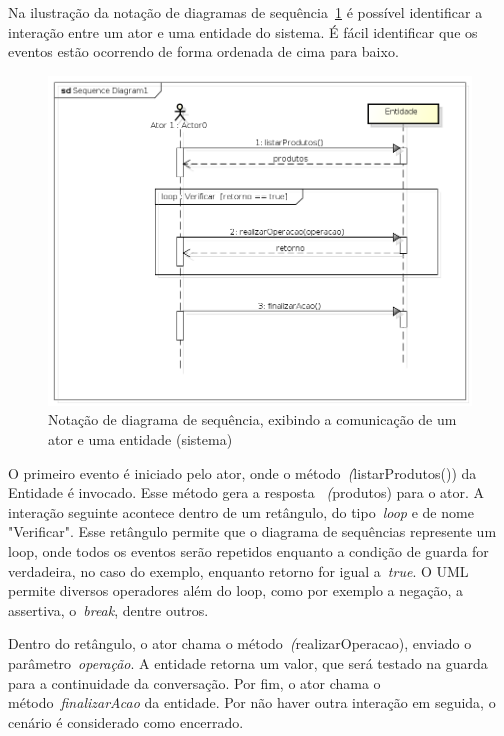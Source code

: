 Na ilustração da notação de diagramas de sequência~\ref{fig:exemplo-diagrama-sequencia} é possível identificar a interação entre um ator e uma entidade do sistema. É fácil identificar que os eventos estão ocorrendo de forma ordenada de cima para baixo.
\begin{figure}
	\centering
	\includegraphics[scale=0.75]{images/exemplo-diagrama-sequencia.png}
	\caption{Notação de diagrama de sequência, exibindo a comunicação de um ator e uma entidade (sistema)}
	\label{fig:exemplo-diagrama-sequencia}
\end{figure}

O primeiro evento é iniciado pelo ator, onde o método~\emph(listarProdutos()) da Entidade é invocado. Esse método gera a resposta ~\emph(produtos) para o ator. A interação seguinte acontece dentro de um retângulo, do tipo~\emph{loop} e de nome "Verificar". Esse retângulo permite que o diagrama de sequências represente um loop, onde todos os eventos serão repetidos enquanto a condição de guarda for verdadeira, no caso do exemplo, enquanto retorno for igual a~\emph{true}. O UML permite diversos operadores além do loop, como por exemplo a negação, a assertiva, o~\emph{break}, dentre outros.

Dentro do retângulo, o ator chama o método~\emph(realizarOperacao), enviado o parâmetro~\emph{operação}. A entidade retorna um valor, que será testado na guarda para a continuidade da conversação. Por fim, o ator chama o método~\emph{finalizarAcao} da entidade. Por não haver outra interação em seguida, o cenário é considerado como encerrado. 

